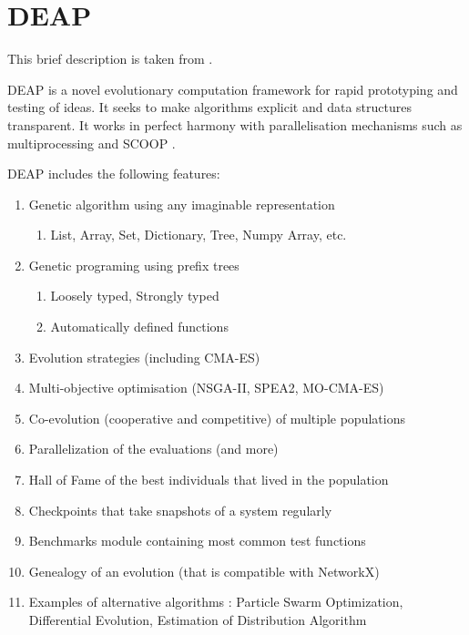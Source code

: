 
\chapter{DEAP}
\label{chap:DEAP}

This brief description is taken from \cite{DEAPGitHub2019}.

DEAP is a novel evolutionary computation framework for rapid prototyping and testing of ideas. It seeks to make algorithms explicit and data structures transparent. It works in perfect harmony with parallelisation mechanisms such as multiprocessing and SCOOP \cite{SCOOPDocs2019}.

DEAP includes the following features:
\begin{enumerate}
\item Genetic algorithm using any imaginable representation
\begin{enumerate}
\item List, Array, Set, Dictionary, Tree, Numpy Array, etc.
\end{enumerate}
\item Genetic programing using prefix trees
\begin{enumerate}
\item Loosely typed, Strongly typed
\item Automatically defined functions
\end{enumerate}
\item Evolution strategies (including CMA-ES)
\item Multi-objective optimisation (NSGA-II, SPEA2, MO-CMA-ES)
\item Co-evolution (cooperative and competitive) of multiple populations
\item Parallelization of the evaluations (and more)
\item Hall of Fame of the best individuals that lived in the population
\item Checkpoints that take snapshots of a system regularly
\item Benchmarks module containing most common test functions
\item Genealogy of an evolution (that is compatible with NetworkX)
\item Examples of alternative algorithms : Particle Swarm Optimization, Differential Evolution, Estimation of Distribution Algorithm

\end{enumerate}



